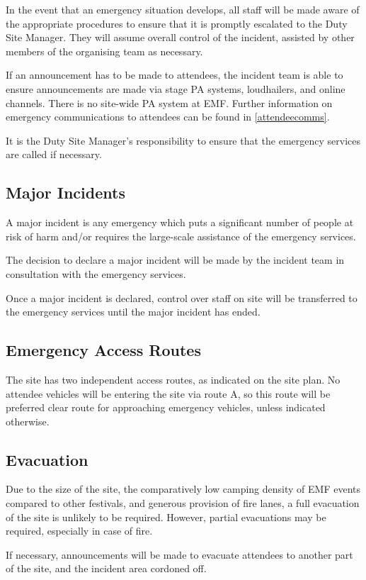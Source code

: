 In the event that an emergency situation develops, all staff will be made aware of
the appropriate procedures to ensure that it is promptly escalated to the Duty Site Manager.
They will assume overall control of the incident, assisted by other members of the organising
team as necessary.

If an announcement has to be made to attendees, the incident team is able to
ensure announcements are made via stage PA systems, loudhailers, and online channels.
There is no site-wide PA system at EMF\@. Further information on emergency communications
to attendees can be found in \cref{attendeecomms}.

It is the Duty Site Manager's responsibility to ensure that the emergency services
are called if necessary.

\subsection{Major Incidents}
A major incident is any emergency which puts a significant number of people at risk
of harm and/or requires the large-scale assistance of the emergency services.

The decision to declare a major incident will be made by the incident team in
consultation with the emergency services.

Once a major incident is declared, control over staff on site will be transferred
to the emergency services until the major incident has ended.

\subsection{Emergency Access Routes}\label{emergencyaccess}
The site has two independent access routes, as indicated on the site plan. No
attendee vehicles will be entering the site via route A, so this route will be
preferred clear route for approaching emergency vehicles, unless indicated
otherwise.

\subsection{Evacuation}\label{evacuation}
Due to the size of the site, the comparatively low camping density of EMF events
compared to other festivals, and generous provision of fire lanes, a full evacuation
of the site is unlikely to be required. However, partial evacuations may be required,
especially in case of fire.

If necessary, announcements will be made to evacuate attendees to another part of the
site, and the incident area cordoned off.

